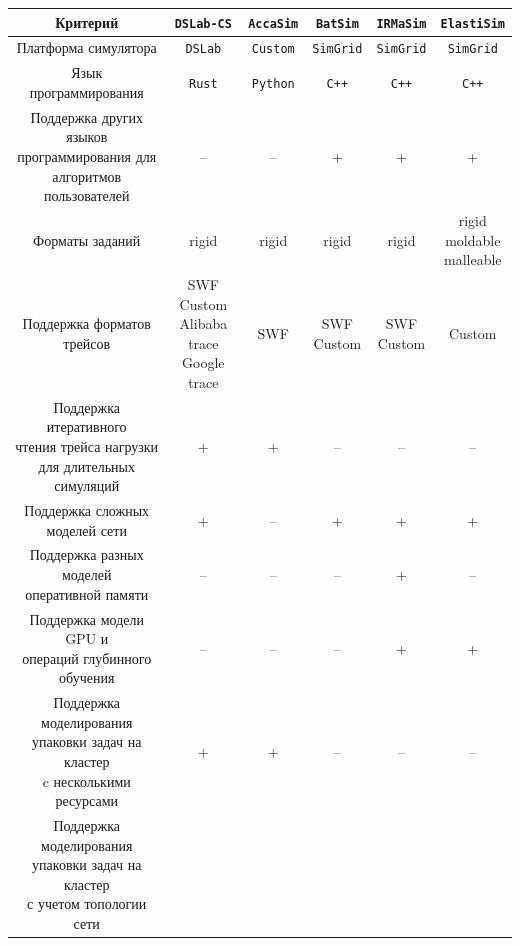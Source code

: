 \begin{table}[h!]
  \small
\centering
\begin{tabular}{|c|c|c|c|c|c|}
\hline
\textbf{Критерий} & \texttt{DSLab-CS} & \texttt{AccaSim} & \texttt{BatSim} & \texttt{IRMaSim} & \texttt{ElastiSim} \\
\hline
Платформа симулятора & \texttt{DSLab} & \texttt{Custom} & \texttt{SimGrid} & \texttt{SimGrid} & \texttt{SimGrid} \\
\hline
Язык программирования & \texttt{Rust} & \texttt{Python} & \texttt{C++} &  \texttt{C++} &  \texttt{C++} \\
\hline
\makecell{Поддержка других языков \\ программирования для \\ алгоритмов пользователей} & -- & -- & + & + & + \\
\hline
Форматы заданий & rigid & rigid & rigid & rigid & \makecell[cc]{rigid\\moldable\\malleable} \\
\hline
Поддержка форматов трейсов & \makecell[cc] {
  SWF\\
  Custom\\
  Alibaba trace\\
  Google trace
} & SWF & \makecell[cc]{SWF\\Custom} & \makecell[cc]{SWF\\Custom} & Custom \\
\hline 
\makecell[cc]{
  Поддержка итеративного \\ чтения трейса нагрузки \\ для длительных симуляций
} & + & + & -- & -- & -- \\
\hline 
\makecell[cc]{
Поддержка сложных \\ моделей сети} & + & -- & + & + & + \\
\hline
\makecell[cc] {
  Поддержка разных моделей \\ оперативной памяти
} & -- & -- & -- & + & -- \\
\hline 
\makecell[cc] {
  Поддержка модели GPU и \\ операций глубинного обучения
} & -- & -- & -- & + & + \\
\hline
\makecell[cc]{
  Поддержка моделирования \\ упаковки задач на кластер \\ c несколькими ресурсами 
} & + & + & -- & -- & -- \\
\hline
\makecell[cc]{
  Поддержка моделирования \\ упаковки задач на кластер \\ с учетом топологии сети
}
\end{tabular}
\end{table}
